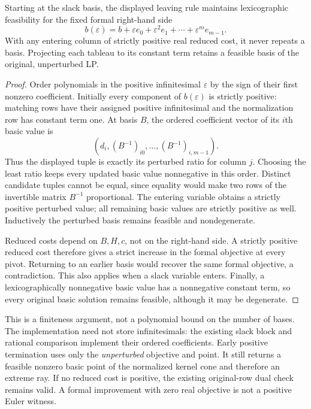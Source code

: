 \begin{proposition}
\label{prop:capped-pivot-lex}
Starting at the slack basis, the displayed leaving rule maintains
lexicographic feasibility for the fixed formal right-hand side
\[
         b(\varepsilon)=b+\varepsilon e_0+
             \varepsilon^2e_1+\cdots+\varepsilon^m e_{m-1}.
\]
With any entering column of strictly positive real reduced cost, it never
repeats a basis.  Projecting each tableau to its constant term retains a
feasible basis of the original, unperturbed LP.
\end{proposition}
\begin{proof}
Order polynomials in the positive infinitesimal $\varepsilon$ by the sign
of their first nonzero coefficient.  Initially every component of
$b(\varepsilon)$ is strictly positive: matching rows have their assigned
positive infinitesimal and the normalization row has constant term one.
At basis $B$, the ordered coefficient vector of its $i$th basic value is
\[
                    (d_i,(B^{-1})_{i0},\ldots,(B^{-1})_{i,m-1}).
\]
Thus the displayed tuple is exactly its perturbed ratio for column $j$.
Choosing the least ratio keeps every updated basic value nonnegative in
this order.  Distinct candidate tuples cannot be equal, since equality
would make two rows of the invertible matrix $B^{-1}$ proportional.
The entering variable obtains a strictly positive perturbed value; all
remaining basic values are strictly positive as well.  Inductively the
perturbed basis remains feasible and nondegenerate.

Reduced costs depend on $B,H,c$, not on the right-hand side.  A strictly
positive reduced cost therefore gives a strict increase in the formal
objective at every pivot.  Returning to an earlier basis would recover
the same formal objective, a contradiction.  This also applies when a
slack variable enters.  Finally, a lexicographically nonnegative basic
value has a nonnegative constant term, so every original basic solution
remains feasible, although it may be degenerate.
\end{proof}

This is a finiteness argument, not a polynomial bound on the number of
bases.  The implementation need not store infinitesimals: the existing
slack block and rational comparison implement their ordered coefficients.
Early positive termination uses only the \emph{unperturbed} objective and
point.  It still returns a feasible nonzero basic point of the normalized
kernel cone and therefore an extreme ray.  If no reduced cost is positive,
the existing original-row dual check remains valid.  A formal improvement
with zero real objective is not a positive Euler witness.

